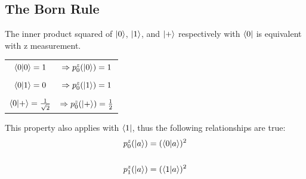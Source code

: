 \documentclass[hidelinks, a4paper, 12pt]{article}
\newcommand{\n}{\\[\baselineskip]}
\newcommand{\thus}{\Rightarrow}
\begin{document}
        \subsection{The Born Rule}
            The inner product squared of $\ket{0}$, $\ket{1}$, and $\ket{+}$ respectively with $\bra{0}$ is equivalent with z measurement.
            \begin{center}
                \begin{tabular}{c c}
                $\braket{0|0} = 1$ & $\thus p_0^z(\ket{0}) = 1$\\
                \\
                $\braket{0|1} = 0$ & $\thus p_0^z(\ket{1}) = 1$\\
                \\
                $\braket{0|+} = \frac{1}{\sqrt{2}}$ & $\thus p_0^z(\ket{+}) = \frac{1}{2}$\\
               \end{tabular}
            \end{center}
            This property also applies with $\bra{1}$, thus the following relationships are true:
            \[\begin{split}
                p_0^z(\ket{a}) &= (\braket{0|a})^2\n
                p_1^z(\ket{a}) &= (\braket{1|a})^2\\
            \end{split}\]
\end{document}
